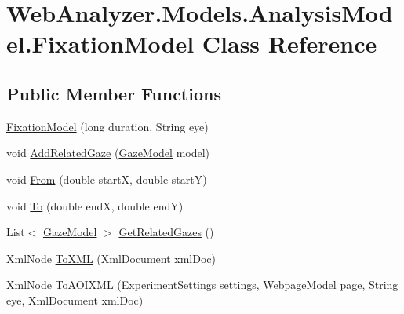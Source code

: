 \hypertarget{class_web_analyzer_1_1_models_1_1_analysis_model_1_1_fixation_model}{}\section{Web\+Analyzer.\+Models.\+Analysis\+Model.\+Fixation\+Model Class Reference}
\label{class_web_analyzer_1_1_models_1_1_analysis_model_1_1_fixation_model}
\subsection*{Public Member Functions}
\begin{DoxyCompactItemize}
\item 
\hyperlink{class_web_analyzer_1_1_models_1_1_analysis_model_1_1_fixation_model_aca8f461aabd98b5e33e4d70e437c0da7}{Fixation\+Model} (long duration, String eye)
\item 
void \hyperlink{class_web_analyzer_1_1_models_1_1_analysis_model_1_1_fixation_model_a8960e4d69b3c8782d89af1195220f911}{Add\+Related\+Gaze} (\hyperlink{class_web_analyzer_1_1_models_1_1_data_model_1_1_gaze_model}{Gaze\+Model} model)
\item 
void \hyperlink{class_web_analyzer_1_1_models_1_1_analysis_model_1_1_fixation_model_aa11ed7734ed0da8d4bbb86b89a986a75}{From} (double start\+X, double start\+Y)
\item 
void \hyperlink{class_web_analyzer_1_1_models_1_1_analysis_model_1_1_fixation_model_a3a34442019813f39e6acbbb881017808}{To} (double end\+X, double end\+Y)
\item 
List$<$ \hyperlink{class_web_analyzer_1_1_models_1_1_data_model_1_1_gaze_model}{Gaze\+Model} $>$ \hyperlink{class_web_analyzer_1_1_models_1_1_analysis_model_1_1_fixation_model_afd82114a1c8126e23215962e4cf135f8}{Get\+Related\+Gazes} ()
\item 
Xml\+Node \hyperlink{class_web_analyzer_1_1_models_1_1_analysis_model_1_1_fixation_model_aa1ffa2d3c9eb95d6f715bba93be56c13}{To\+X\+M\+L} (Xml\+Document xml\+Doc)
\item 
Xml\+Node \hyperlink{class_web_analyzer_1_1_models_1_1_analysis_model_1_1_fixation_model_a50f39e8bfdf3a716c39f258b25455204}{To\+A\+O\+I\+X\+M\+L} (\hyperlink{class_web_analyzer_1_1_models_1_1_settings_model_1_1_experiment_settings}{Experiment\+Settings} settings, \hyperlink{class_web_analyzer_1_1_models_1_1_data_model_1_1_webpage_model}{Webpage\+Model} page, String eye, Xml\+Document xml\+Doc)
\end{DoxyCompactItemize}
